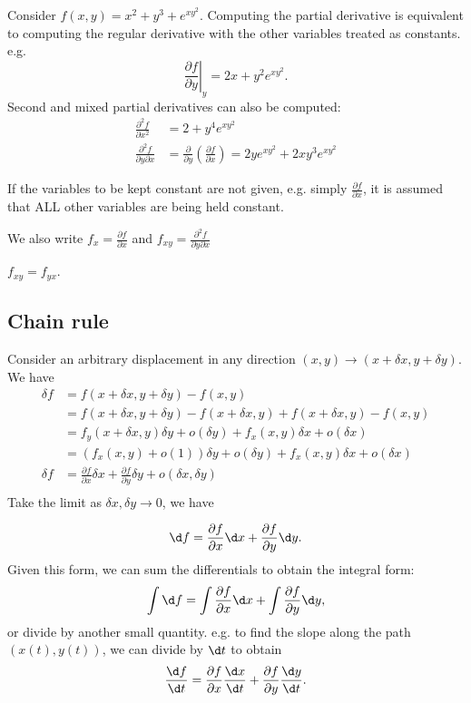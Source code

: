 \documentclass[a4paper]{article}
\begin{document}
\begin{eg}
  Consider $f(x, y) = x^2 + y^3 + e^{xy^2}$. Computing the partial derivative is equivalent to computing the regular derivative with the other variables treated as constants. e.g.
  \[
  \left.\frac{\partial f}{\partial y}\right|_y = 2x + y^2e^{xy^2}.
  \]
Second and mixed partial derivatives can also be computed:
\begin{align*}
  \frac{\partial^2f}{\partial x^2} &= 2 + y^4e^{xy^2}\\
  \frac{\partial^2 f}{\partial y\partial x} &= \frac{\partial}{\partial y}\left(\frac{\partial f}{\partial x}\right) = 2ye^{xy^2} + 2xy^{3}e^{xy^2}
\end{align*}

\end{eg}
\begin{notation}
  If the variables to be kept constant are not given, e.g. simply $\frac{\partial f}{\partial x}$, it is assumed that ALL other variables are being held constant.

  We also write $f_x = \frac{\partial f}{\partial x}$ and $f_{xy} = \frac{\partial^2 f}{\partial y\partial x}$
\end{notation}
\begin{thm}
  $f_{xy} = f_{yx}$.
\end{thm}
\subsection{Chain rule}
Consider an arbitrary displacement in any direction $(x, y) \to (x+\delta x, y + \delta y)$. We have
\begin{align*}
  \delta f &= f(x+\delta x, y + \delta y) - f(x, y)\\
  &= f(x+\delta x, y + \delta y) - f(x + \delta x, y) + f(x+\delta x, y) - f(x, y)\\
  &= f_y(x + \delta x, y)\delta y + o(\delta y) + f_x(x, y)\delta x + o(\delta x)\\
  &= (f_x(x, y) + o(1))\delta y + o(\delta y) + f_x(x, y)\delta x + o(\delta x)\\
  \delta f&= \frac{\partial f}{\partial x}\delta x + \frac{\partial f}{\partial y}\delta y + o(\delta x, \delta y)\\
\end{align*}
Take the limit as $\delta x, \delta y \to 0$, we have 
\begin{thm}
  \[
  \d f = \frac{\partial f}{\partial x}\d x + \frac{\partial f}{\partial y}\d y.
  \]
  Given this form, we can sum the differentials to obtain the integral form:
  \[
  \int \d f = \int \frac{\partial f}{\partial x}\d x + \int \frac{\partial f}{\partial y}\d y,
  \]
  or divide by another small quantity. e.g. to find the slope along the path $(x(t), y(t))$, we can divide by $\d t$ to obtain
  \[
  \frac{\d f}{\d t} = \frac{\partial f}{\partial x}\frac{\d x}{\d t} + \frac{\partial f}{\partial y}\frac{\d y}{\d t}.
  \]
\end{thm}
\end{document}
